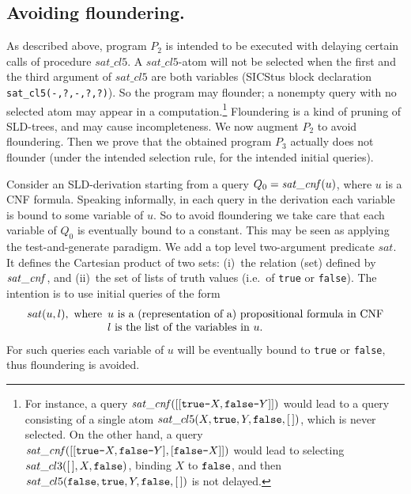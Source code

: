 \documentclass{tlp}
\newcommand*{\mydash}{{\mbox{\tt-}}}
\begin{document}
\subsection{Avoiding floundering.}
\label{sec:nonfloundering}
As described above, program $P_2$ is intended to be executed with delaying 
certain calls of procedure $sat\_cl5$. 
A $sat\_cl5$-atom will not be selected when the first and the third
argument of $sat\_cl5$ are both variables
(SICStus block declaration {\tt sat\_cl5(-,?,-,?,?)}).
So the program may flounder;
a nonempty query with no selected atom may appear in a computation.\footnote{For instance, a query ${\it sat\_c n f}([[{\tt true}\mydash X,{\tt false}\mydash Y]])$
  would lead to a query
   consisting of a single atom
  $sat\_cl5(X,{\tt true},Y,{\tt false},[\,])$,
which is never selected.
  On the other hand, a query
  ${\it sat\_c n f}([[{\tt true}\mydash X,{\tt false}\mydash Y],[{\tt false}\mydash X]])$
  would lead to selecting 
  $sat\_cl3([\,],X,{\tt false})$, binding $X$ to ${\tt false}$, and then 
  $sat\_cl5({\tt false},{\tt true},Y,{\tt false},[\,])$ is not delayed.
}
Floundering is a kind of pruning of SLD-trees, and may cause incompleteness.
We now augment $P_2$ to avoid floundering.
Then we prove that the obtained program $P_3$ actually does not flounder
(under the intended selection rule, for the intended initial queries). 













 Consider an SLD-derivation starting from a query
 $Q_0 ={\it sat\_c n f}(u)$, where $u$ is a CNF formula.
   Speaking informally, in each query in the derivation each variable is
   bound to some variable of $u$.
 So to avoid floundering we take care that each variable of
 $Q_0$ is eventually bound to a constant.
This may be seen as applying the test-and-generate paradigm.
We add a top level two-argument predicate $sat$. 
It defines the Cartesian product of 
two sets:
(i)~the relation (set) defined by ${\it sat\_c n f}$, and
(ii)~the set of lists of truth values (i.e.\ of {\tt true} or {\tt false}).
The intention is to use initial queries of the form
\begin{equation}
  \begin{array}{@{}c@{}}
  sat(u,l),   \mbox{ where}
  \begin{array}[t]{l@{}}
    u \mbox{ is a (representation of a) propositional formula in CNF}
    \\
    l \mbox{ is the list of the variables in }u.
  \end{array}
  \end{array}
  \label{initial.query}
\end{equation}
For such queries each variable of $u$ will be eventually bound to
{\tt true} or {\tt false}, thus floundering is avoided.
\end{document}
